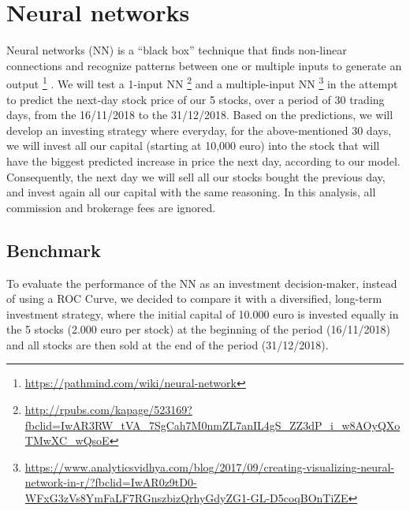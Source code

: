 \documentclass[
  11pt,
]{article}
\begin{document}
\newpage

\hypertarget{neural-networks}{%
\section{Neural networks}\label{neural-networks}}

Neural networks (NN) is a ``black box'' technique that finds non-linear
connections and recognize patterns between one or multiple inputs to
generate an output \footnote{\url{https://pathmind.com/wiki/neural-network}}
. We will test a 1-input NN \footnote{\url{http://rpubs.com/kapage/523169?fbclid=IwAR3RW_tVA_7SgCah7M0nmZL7anIL4gS_ZZ3dP_i_w8AOyQXoTMwXC_wQsoE}}
and a multiple-input NN \footnote{\url{https://www.analyticsvidhya.com/blog/2017/09/creating-visualizing-neural-network-in-r/?fbclid=IwAR0z9tD0-WFxG3zVs8YmFaLF7RGnszbizQrhyGdyZG1-GL-D5coqBOnTiZE}}
in the attempt to predict the next-day stock price of our 5 stocks, over
a period of 30 trading days, from the 16/11/2018 to the 31/12/2018.
Based on the predictions, we will develop an investing strategy where
everyday, for the above-mentioned 30 days, we will invest all our
capital (starting at 10,000 euro) into the stock that will have the
biggest predicted increase in price the next day, according to our
model. Consequently, the next day we will sell all our stocks bought the
previous day, and invest again all our capital with the same reasoning.
In this analysis, all commission and brokerage fees are ignored.

\hypertarget{benchmark}{%
\subsection{Benchmark}\label{benchmark}}

To evaluate the performance of the NN as an investment decision-maker,
instead of using a ROC Curve, we decided to compare it with a
diversified, long-term investment strategy, where the initial capital of
10.000 euro is invested equally in the 5 stocks (2.000 euro per stock)
at the beginning of the period (16/11/2018) and all stocks are then sold
at the end of the period (31/12/2018).
\end{document}
